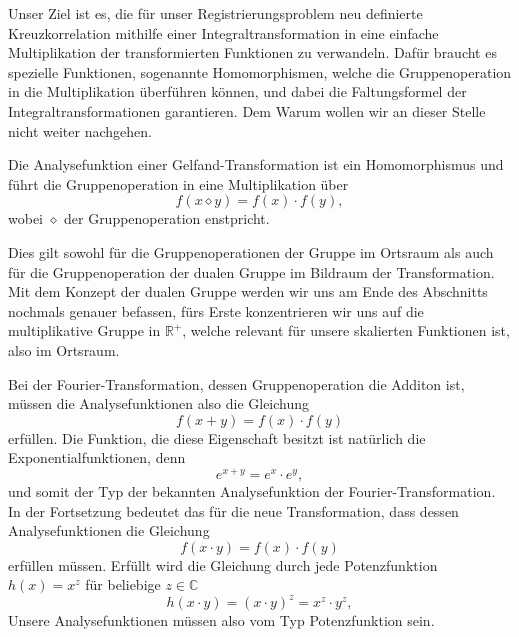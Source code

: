 Unser Ziel ist es, die für unser Registrierungsproblem neu definierte 
Kreuzkorrelation mithilfe einer Integraltransformation in eine 
einfache Multiplikation der transformierten Funktionen zu verwandeln.
Dafür braucht es spezielle Funktionen, sogenannte Homomorphismen, welche 
die Gruppenoperation in die Multiplikation überführen können, und dabei 
die Faltungsformel der Integraltransformationen garantieren.
Dem Warum wollen wir an dieser Stelle nicht weiter nachgehen.
\begin{satz}
    Die Analysefunktion einer Gelfand-Transformation ist ein 
    Homomorphismus und führt die Gruppenoperation in eine 
    Multiplikation über
    \[
        f(x \diamond y) 
        = f(x) \cdot f(y)
        ,
    \]
    wobei $\diamond$ der Gruppenoperation enstpricht.
\end{satz}
Dies gilt sowohl für die Gruppenoperationen der Gruppe im Ortsraum als auch 
für die Gruppenoperation der dualen Gruppe im Bildraum der Transformation.
Mit dem Konzept der dualen Gruppe werden wir uns am Ende des Abschnitts 
nochmals genauer befassen, fürs Erste konzentrieren wir uns auf die 
multiplikative Gruppe in $\mathbb{R^+}$, welche relevant für unsere 
skalierten Funktionen ist, also im Ortsraum.
\medskip

Bei der Fourier-Transformation, dessen Gruppenoperation die Additon ist, 
müssen die Analysefunktionen also die Gleichung 
\begin{equation}
    f(x + y) 
    = f(x) \cdot f(y)
    \label{mellin:hom1}
\end{equation}
erfüllen. 
Die Funktion, die diese Eigenschaft besitzt ist natürlich die 
Exponentialfunktionen, denn 
\begin{equation}
    e^{x + y} 
    = e^x \cdot e^y
    ,
    \label{mellin:exp}
\end{equation}
und somit der Typ der bekannten Analysefunktion der Fourier-Transformation.
In der Fortsetzung bedeutet das für die neue Transformation, dass dessen 
Analysefunktionen die Gleichung
\begin{equation}
    f(x \cdot y) 
    = f(x) \cdot f(y)
    \label{mellin:hom2}
\end{equation}
erfüllen müssen.
Erfüllt wird die Gleichung durch jede Potenzfunktion $h(x) = x^{z}$ für 
beliebige $z \in \mathbb{C}$ 
\begin{equation}
    h(x \cdot y) 
    = (x \cdot y)^{z} = x^{z} \cdot y^{z}
    ,
\end{equation}
Unsere Analysefunktionen müssen also vom Typ Potenzfunktion sein.

